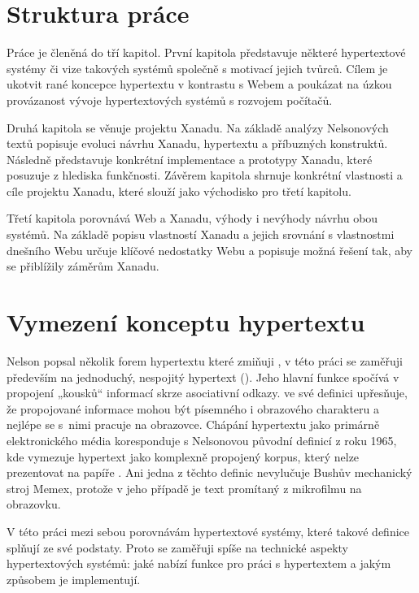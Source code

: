 \section{Struktura práce}

Práce je členěná do tří kapitol. První kapitola představuje některé hypertextové systémy či vize takových systémů společně s motivací jejich tvůrců. Cílem je ukotvit rané koncepce hypertextu v kontrastu s Webem a poukázat na úzkou provázanost vývoje hypertextových systémů s rozvojem počítačů.

Druhá kapitola se věnuje projektu Xanadu. Na základě analýzy Nelsonových textů popisuje evoluci návrhu Xanadu, hypertextu a příbuzných konstruktů. Následně představuje konkrétní implementace a prototypy Xanadu, které posuzuje z hlediska funkčnosti. Závěrem kapitola shrnuje konkrétní vlastnosti a cíle projektu Xanadu, které slouží jako východisko pro třetí kapitolu.

Třetí kapitola porovnává Web a Xanadu, výhody i nevýhody návrhu obou systémů. 
Na základě popisu vlastností Xanadu a jejich srovnání s vlastnostmi dnešního Webu určuje klíčové nedostatky Webu a popisuje možná řešení tak, aby se přiblížily záměrům Xanadu.

\section{Vymezení konceptu hypertextu}

Nelson popsal několik forem hypertextu které zmiňuji , v této práci se zaměřuji především na jednoduchý, nespojitý hypertext (). Jeho hlavní funkce spočívá v propojení „kousků“ informací skrze asociativní odkazy. \Textcite[7]{Barnet2014} ve své definici upřesňuje, že propojované informace mohou být písemného i obrazového charakteru a nejlépe se s~nimi pracuje na obrazovce. Chápání hypertextu jako primárně elektronického média koresponduje s Nelsonovou původní definicí z roku 1965, kde vymezuje hypertext jako komplexně propojený korpus, který nelze prezentovat na papíře \autocite[96]{Nelson1965}. Ani jedna z těchto definic nevylučuje Bushův mechanický stroj Memex, protože v jeho případě je text promítaný z mikrofilmu na obrazovku.

V této práci mezi sebou porovnávám hypertextové systémy, které takové definice splňují ze své podstaty. Proto se zaměřuji spíše na technické aspekty hypertextových systémů: jaké nabízí funkce pro práci s hypertextem a jakým způsobem je implementují.

